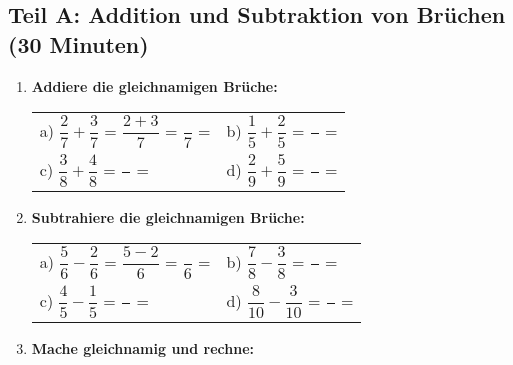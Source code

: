 \subsection*{Teil A: Addition und Subtraktion von Brüchen (30 Minuten)}

\begin{enumerate}[label=\arabic*.]
    \item \textbf{Addiere die gleichnamigen Brüche:}

    \vspace{0.5cm}
    \begin{tabular}{ll}
        a) $\dfrac{2}{7} + \dfrac{3}{7}$ = $\dfrac{2+3}{7}$ = $\dfrac{\phantom{5}}{7}$ = \underline{\hspace{3cm}} & 
        b) $\dfrac{1}{5} + \dfrac{2}{5}$ = $\dfrac{\phantom{5}}{\phantom{5}}$ = \underline{\hspace{3cm}} \\[4ex]
        c) $\dfrac{3}{8} + \dfrac{4}{8}$ = $\dfrac{\phantom{5}}{\phantom{5}}$ = \underline{\hspace{3cm}} & 
        d) $\dfrac{2}{9} + \dfrac{5}{9}$ = $\dfrac{\phantom{5}}{\phantom{5}}$ = \underline{\hspace{3cm}}
    \end{tabular}

    \vspace{1cm}

    \item \textbf{Subtrahiere die gleichnamigen Brüche:}

    \vspace{0.5cm}
    \begin{tabular}{ll}
        a) $\dfrac{5}{6} - \dfrac{2}{6}$ = $\dfrac{5-2}{6}$ = $\dfrac{\phantom{5}}{6}$ = \underline{\hspace{3cm}} & 
        b) $\dfrac{7}{8} - \dfrac{3}{8}$ = $\dfrac{\phantom{5}}{\phantom{5}}$ = \underline{\hspace{3cm}} \\[4ex]
        c) $\dfrac{4}{5} - \dfrac{1}{5}$ = $\dfrac{\phantom{5}}{\phantom{5}}$ = \underline{\hspace{3cm}} & 
        d) $\dfrac{8}{10} - \dfrac{3}{10}$ = $\dfrac{\phantom{5}}{\phantom{5}}$ = \underline{\hspace{3cm}}
    \end{tabular}

    \vspace{1cm}

    \item \textbf{Mache gleichnamig und rechne:}


\end{enumerate}
